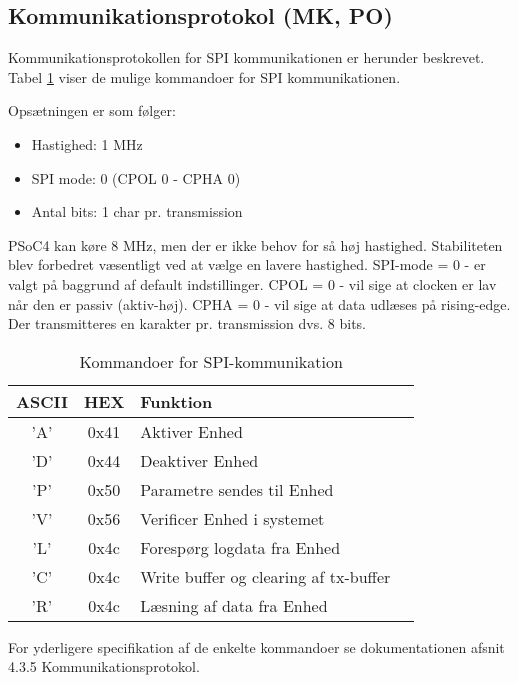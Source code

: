 \subsection{Kommunikationsprotokol (MK, PO)}
Kommunikationsprotokollen for SPI kommunikationen er herunder beskrevet. Tabel \ref{tabel:SWProtokol-kommandoer} viser de mulige kommandoer for SPI kommunikationen. 

Opsætningen er som følger:

\begin{itemize}
  \item Hastighed: 1 MHz
  \item SPI mode: 0 (CPOL 0 - CPHA 0)
  \item Antal bits: 1 char pr. transmission
\end{itemize}

PSoC4 kan køre 8 MHz, men der er ikke behov for så høj hastighed. Stabiliteten blev forbedret væsentligt ved at vælge en lavere hastighed. 
\newline SPI-mode = 0 - er valgt på baggrund af default indstillinger. 
\newline CPOL = 0 - vil sige at clocken er lav når den er passiv (aktiv-høj). 
\newline CPHA = 0 - vil sige at data udlæses på rising-edge. 
\newline Der transmitteres en karakter pr. transmission dvs. 8 bits.

\begin{table}[H]
\caption{Kommandoer for SPI-kommunikation}
\centering
\begin{tabular}{|c|c|l|c|}
\hline 
\textbf{ASCII} & \textbf{HEX} & \textbf{Funktion} \\ 
\hline 
'A' & 0x41 & Aktiver Enhed \\ 
\hline 
'D' & 0x44 & Deaktiver Enhed \\ 
\hline 
'P' & 0x50 & Parametre sendes til Enhed \\
\hline 
'V' & 0x56 & Verificer Enhed i systemet \\ 
\hline
'L' & 0x4c & Forespørg logdata fra Enhed \\ 
\hline
'C' & 0x4c & Write buffer og clearing af tx-buffer  \\
\hline
'R' & 0x4c & Læsning af data fra Enhed \\
\hline
\end{tabular}
\label{tabel:SWProtokol-kommandoer}
\end{table} 


For yderligere specifikation af de enkelte kommandoer se dokumentationen afsnit 4.3.5 Kommunikationsprotokol.